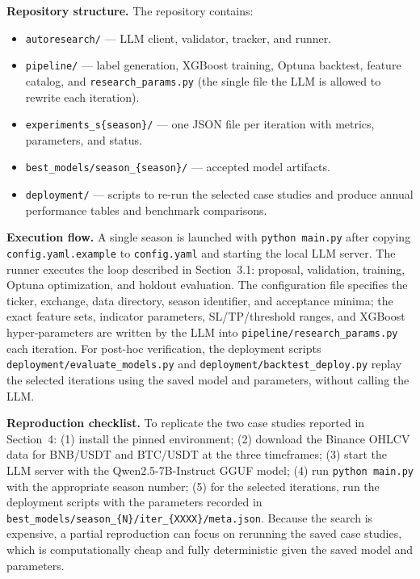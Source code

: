 \documentclass[analytics,article,submit,pdftex,moreauthors]{Definitions/mdpi}
\providecommand{\tightlist}{\setlength{\itemsep}{0pt}\setlength{\parskip}{0pt}}
\begin{document}
\textbf{Repository structure.} The repository contains:

\begin{itemize}
\tightlist
\item
  \texttt{autoresearch/} --- LLM client, validator, tracker, and runner.
\item
  \texttt{pipeline/} --- label generation, XGBoost training, Optuna backtest, feature catalog, and \texttt{research\_params.py} (the single file the LLM is allowed to rewrite each iteration).
\item
  \texttt{experiments\_s\{season\}/} --- one JSON file per iteration with metrics, parameters, and status.
\item
  \texttt{best\_models/season\_\{season\}/} --- accepted model artifacts.
\item
  \texttt{deployment/} --- scripts to re-run the selected case studies and produce annual performance tables and benchmark comparisons.
\end{itemize}

\textbf{Execution flow.} A single season is launched with \texttt{python\ main.py} after copying \texttt{config.yaml.example} to \texttt{config.yaml} and starting the local LLM server. The runner executes the loop described in Section~3.1: proposal, validation, training, Optuna optimization, and holdout evaluation. The configuration file specifies the ticker, exchange, data directory, season identifier, and acceptance minima; the exact feature sets, indicator parameters, SL/TP/threshold ranges, and XGBoost hyper-parameters are written by the LLM into \texttt{pipeline/research\_params.py} each iteration. For post-hoc verification, the deployment scripts \texttt{deployment/evaluate\_models.py} and \texttt{deployment/backtest\_deploy.py} replay the selected iterations using the saved model and parameters, without calling the LLM.

\textbf{Reproduction checklist.} To replicate the two case studies reported in Section~4: (1) install the pinned environment; (2) download the Binance OHLCV data for BNB/USDT and BTC/USDT at the three timeframes; (3) start the LLM server with the Qwen2.5-7B-Instruct GGUF model; (4) run \texttt{python\ main.py} with the appropriate season number; (5) for the selected iterations, run the deployment scripts with the parameters recorded in \texttt{best\_models/season\_\{N\}/iter\_\{XXXX\}/meta.json}. Because the search is expensive, a partial reproduction can focus on rerunning the saved case studies, which is computationally cheap and fully deterministic given the saved model and parameters.
\end{document}
